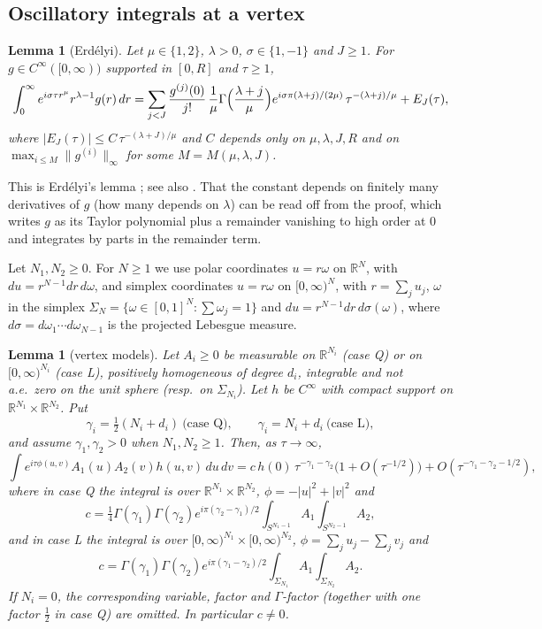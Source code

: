 \documentclass[11pt,a4paper]{article}
\newtheorem{lemma}[theorem]{Lemma}
\theoremstyle{definition}
\theoremstyle{remark}
\newcommand{\R}{\mathbb R}
\numberwithin{equation}{section}
\begin{document}
\subsection{Oscillatory integrals at a vertex}

\begin{lemma}[Erd\'elyi]\label{V:lem:erdelyi}
Let $\mu\in\{1,2\}$, $\lambda>0$, $\sigma\in\{1,-1\}$ and $J\ge1$. For $g\in C^\infty([0,\infty))$ supported in $[0,R]$ and $\tau\ge1$,
\[
\int_0^\infty e^{i\sigma\tau r^\mu}r^{\lambda-1}g(r)\,dr=\sum_{j<J}\frac{g^{(j)}(0)}{j!}\,\frac1\mu\Gamma\Bigl(\frac{\lambda+j}\mu\Bigr)e^{i\sigma\pi(\lambda+j)/(2\mu)}\,\tau^{-(\lambda+j)/\mu}+E_J(\tau),
\]
where $|E_J(\tau)|\le C\,\tau^{-(\lambda+J)/\mu}$ and $C$ depends only on $\mu,\lambda,J,R$ and on $\max_{i\le M}\|g^{(i)}\|_\infty$ for some $M=M(\mu,\lambda,J)$.
\end{lemma}

This is Erd\'elyi's lemma \cite{Erd56}; see also \cite{Won89}. That the constant depends on finitely many derivatives of $g$ (how many depends on $\lambda$) can be read off from the proof, which writes $g$ as its Taylor polynomial plus a remainder vanishing to high order at $0$ and integrates by parts in the remainder term.

Let $N_1,N_2\ge0$. For $N\ge1$ we use polar coordinates $u=r\omega$ on $\R^N$, with $du=r^{N-1}dr\,d\omega$, and simplex coordinates $u=r\omega$ on $[0,\infty)^N$, with $r=\sum_ju_j$, $\omega$ in the simplex $\Sigma_N=\{\omega\in[0,1]^N:\sum\omega_j=1\}$ and $du=r^{N-1}dr\,d\sigma(\omega)$, where $d\sigma=d\omega_1\cdots d\omega_{N-1}$ is the projected Lebesgue measure.

\begin{lemma}[vertex models]\label{V:lem:vertex-model}
Let $A_i\ge0$ be measurable on $\R^{N_i}$ \textup{(}case Q\textup{)} or on $[0,\infty)^{N_i}$ \textup{(}case L\textup{)}, positively homogeneous of degree $d_i$, integrable and not a.e.\ zero on the unit sphere \textup{(}resp.\ on $\Sigma_{N_i}$\textup{)}. Let $h$ be $C^\infty$ with compact support on $\R^{N_1}\times\R^{N_2}$. Put
\[
\gamma_i=\tfrac12(N_i+d_i)\ \text{(case Q)},\qquad\gamma_i=N_i+d_i\ \text{(case L)},
\]
and assume $\gamma_1,\gamma_2>0$ when $N_1,N_2\ge1$. Then, as $\tau\to\infty$,
\[
\int e^{i\tau\phi(u,v)}A_1(u)A_2(v)h(u,v)\,du\,dv=c\,h(0)\,\tau^{-\gamma_1-\gamma_2}\bigl(1+O(\tau^{-1/2})\bigr)+O(\tau^{-\gamma_1-\gamma_2-1/2}),
\]
where in case Q the integral is over $\R^{N_1}\times\R^{N_2}$, $\phi=-|u|^2+|v|^2$ and
\[
c=\tfrac14\Gamma(\gamma_1)\Gamma(\gamma_2)e^{i\pi(\gamma_2-\gamma_1)/2}\int_{S^{N_1-1}}A_1\int_{S^{N_2-1}}A_2 ,
\]
and in case L the integral is over $[0,\infty)^{N_1}\times[0,\infty)^{N_2}$, $\phi=\sum_ju_j-\sum_jv_j$ and
\[
c=\Gamma(\gamma_1)\Gamma(\gamma_2)e^{i\pi(\gamma_1-\gamma_2)/2}\int_{\Sigma_{N_1}}A_1\int_{\Sigma_{N_2}}A_2 .
\] If $N_i=0$, the corresponding variable, factor and $\Gamma$-factor (together with one factor $\tfrac12$ in case Q) are omitted. In particular $c\ne0$.
\end{lemma}
\end{document}
